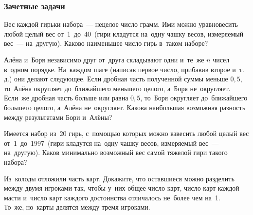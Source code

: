 \subsubsection*{Зачетные задачи}

\begin{problems}

\item
Вес каждой гирьки набора~--- нецелое число грамм.
Ими можно уравновесить любой целый вес от~1\, до~40\,
(гири кладутся на~одну чашку весов, измеряемый вес~--- на~другую).
Каково наименьшее число гирь в~таком наборе?

\item
Алёна и~Боря независимо друг от~друга складывают одни и~те~же $n$ чисел в~одном
порядке.
На~каждом шаге (написав первое число, прибавив второе и~т.\,д.) они делают
следующее.
Если дробная часть полученной суммы меньше $0{,}5$, то~Алёна округляет
до~ближайшего меньшего целого, а~Боря не~округляет.
Если~же дробная часть больше или равна $0{,}5$, то~Боря округляет до~ближайшего
большего целого, а~Алёна не~округляет.
Какова наибольшая возможная разность между результатами Бори и~Алёны?

Имеется набор из~20 гирь, с~помощью которых можно взвесить любой целый вес
от~1\, до~1997\,
(гири кладутся на~одну чашку весов, измеряемый вес~--- на~другую).
Каков минимально возможный вес самой тяжелой гири такого набора?

\subproblem
Из~колоды отложили часть карт.
Докажите, что оставшиеся можно разделить между двумя игроками так, чтобы у~них
общее число карт, число карт каждой масти и~число карт каждого достоинства
отличалось не~более чем на~1.
\\
\subproblem
То~же, но~карты делятся между тремя игроками.

\end{problems}


